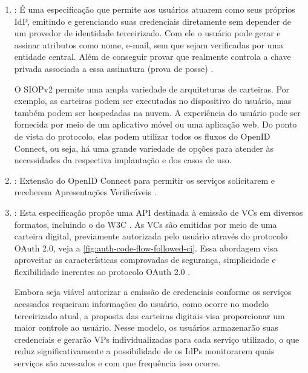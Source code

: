\begin{enumerate}

    \item \textbf{}: É uma especificação que permite aos usuários atuarem como seus próprios \acs{IdP}, emitindo e gerenciando suas credenciais diretamente sem depender de um provedor de identidade terceirizado. Com ele o usuário pode gerar e assinar atributos como nome, e-mail, sem que sejam verificadas por uma entidade central. Além de conseguir provar que realmente controla a chave privada associada a essa assinatura (prova de posse) \cite{SIOPv2023}. 

    O \acs{SIOPv2} permite uma ampla variedade de arquiteturas de carteiras. Por exemplo, as carteiras podem ser executadas no dispositivo do usuário, mas também podem ser hospedadas na nuvem. A experiência do usuário pode ser fornecida por meio de um aplicativo móvel ou uma aplicação web. Do ponto de vista do protocolo, elas podem utilizar todos os fluxos do OpenID Connect, ou seja, há uma grande variedade de opções para atender às necessidades da respectiva implantação e dos casos de uso.
    
    \item \textbf{}: Extensão do OpenID Connect para permitir os serviços solicitarem e receberem Apresentações Verificáveis \cite{OIDC4VP2023}.
    
    \item \textbf{}: Esta especificação propõe uma API destinada à emissão de \acs{VC}s em diversos formatos, incluindo o do W3C \cite{data-model-w3c}. As \acs{VC}s são emitidas por meio de uma carteira digital, previamente autorizada pelo usuário através do protocolo OAuth 2.0, veja a \autoref{fig:auth-code-flow-followed-ci}. Essa abordagem visa aproveitar as características comprovadas de segurança, simplicidade e flexibilidade inerentes ao protocolo OAuth 2.0 \cite{OIDC4CI2023}.

    Embora seja viável autorizar a emissão de credenciais conforme os serviços acessados requeiram informações do usuário, como ocorre no modelo terceirizado atual, a proposta das carteiras digitais visa proporcionar um maior controle ao usuário. Nesse modelo, os usuários armazenarão suas credenciais e gerarão \acs{VP}s individualizadas para cada serviço utilizado, o que reduz significativamente a possibilidade de os \acs{IdP}s monitorarem quais serviços são acessados e com que frequência isso ocorre.
    
\end{enumerate}

